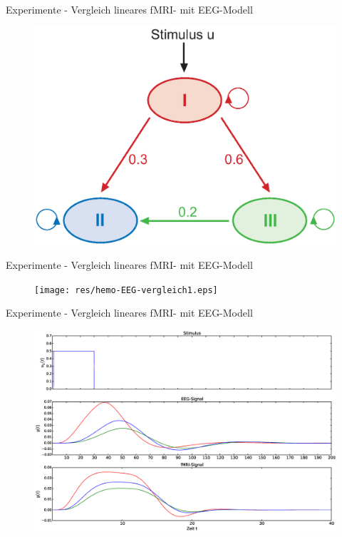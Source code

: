 \documentclass{beamer}
\begin{document}
\begin{frame}{Experimente - Vergleich lineares fMRI- mit EEG-Modell}
\begin{figure}
\centering
\includegraphics[scale=0.5]{res/160708VergleichfMRIvsEEG.eps}
\end{figure}
\end{frame}


\begin{frame}{Experimente - Vergleich lineares fMRI- mit EEG-Modell}
\begin{figure}
\centering
\texttt{[image: res/hemo-EEG-vergleich1.eps]}
\end{figure}
\end{frame}

\begin{frame}{Experimente - Vergleich lineares fMRI- mit EEG-Modell}
\begin{figure}
\centering
\includegraphics[scale=0.25]{res/hemo-EEG-vergleich2.eps}
\end{figure}
\end{frame}
\end{document}
